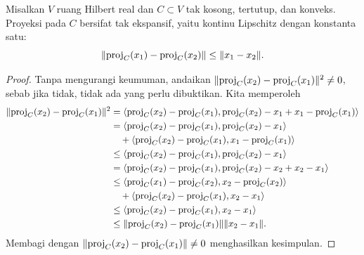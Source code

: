 \begin{prop}
    Misalkan \(V\) ruang Hilbert real dan \(C\subset V\) tak kosong, tertutup, dan konveks. Proyeksi pada \(C\) bersifat tak ekspansif, yaitu kontinu Lipschitz dengan konstanta satu:
    \begin{equation}
        \|\mathrm{proj}_C(x_1)-\mathrm{proj}_C(x_2)\|\leq \|x_1-x_2\|.
    \end{equation}
\end{prop}
\begin{proof}
    Tanpa mengurangi keumuman, andaikan
    \(\|\mathrm{proj}_C(x_2)-\mathrm{proj}_C(x_1)\|^2 \neq 0\), sebab jika tidak, tidak ada yang perlu dibuktikan. Kita memperoleh
    \begin{equation}
        \begin{aligned}
            \|\mathrm{proj}_C(x_2)-\mathrm{proj}_C(x_1)\|^2
            &= \left\langle\mathrm{proj}_C(x_2)-\mathrm{proj}_C(x_1) , \mathrm{proj}_C(x_2)-x_1+x_1-\mathrm{proj}_C(x_1)\right\rangle\\
            &= \left\langle\mathrm{proj}_C(x_2)-\mathrm{proj}_C(x_1) , \mathrm{proj}_C(x_2)-x_1\right\rangle\\
            &\quad+ \left\langle\mathrm{proj}_C(x_2)-\mathrm{proj}_C(x_1) , x_1-\mathrm{proj}_C(x_1)\right\rangle\\
            &\leq \left\langle\mathrm{proj}_C(x_2)-\mathrm{proj}_C(x_1) , \mathrm{proj}_C(x_2)-x_1\right\rangle\\
            &= \left\langle\mathrm{proj}_C(x_2)-\mathrm{proj}_C(x_1) , \mathrm{proj}_C(x_2)-x_2+x_2-x_1\right\rangle\\
            &\leq \left\langle\mathrm{proj}_C(x_1)-\mathrm{proj}_C(x_2) , x_2-\mathrm{proj}_C(x_2)\right\rangle\\
            &\quad+ \left\langle\mathrm{proj}_C(x_2)-\mathrm{proj}_C(x_1) , x_2-x_1\right\rangle\\
            &\leq \left\langle\mathrm{proj}_C(x_2)-\mathrm{proj}_C(x_1) , x_2-x_1\right\rangle\\
            &\leq \|\mathrm{proj}_C(x_2)-\mathrm{proj}_C(x_1)\|\|x_2-x_1\|.
        \end{aligned}
    \end{equation}
    Membagi dengan \(\|\mathrm{proj}_C(x_2)-\mathrm{proj}_C(x_1)\|\neq 0\) menghasilkan kesimpulan.
\end{proof}

